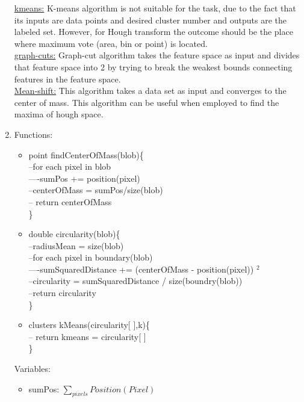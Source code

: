 \documentclass{article}
\begin{document}
\begin{enumerate}
	\underline{kmeans:} K-means algorithm is not suitable for the task, due
	to the fact that its inputs are data points and desired cluster number and
	outputs are the labeled set. However, for Hough transform the outcome should be
	the place where maximum vote (area, bin or point) is located. \\
	\underline{graph-cuts:} Graph-cut algorithm takes the feature space as input
	and divides that feature space into 2 by trying to break the weakest bounds
	connecting features in the feature space. \\ 
	\underline{Mean-shift:} This algorithm takes a data set as input and converges
	to the center of mass. This algorithm can be useful when employed to find the
	maxima of hough space.
	\item
	Functions:
	\begin{itemize}
		\item point findCenterOfMass(blob)\{ \\
		--for each pixel in blob \\
		----sumPos += position(pixel) \\
	 	--centerOfMass = sumPos/size(blob) \\
	 	-- return centerOfMass\\
		\}
		\hline
		\item double circularity(blob)\{\\
		--radiusMean = size(blob)\\
		--for each pixel in boundary(blob)\\
		----sumSquaredDistance += (centerOfMass - position(pixel)) $^ 2$\\
		--circularity = sumSquaredDistance / size(boundry(blob))\\
		--return circularity \\
		\} \\
		\hline 
		\item clusters kMeans(circularity[ ],k)\{ \\
		-- return kmeans = circularity[ ]\\
		\}
	\end{itemize}
	Variables:
	\begin{itemize}
		\item sumPos: $\sum_{pixels}Position(Pixel)$

\end{itemize}
\end{enumerate}
\end{document}
